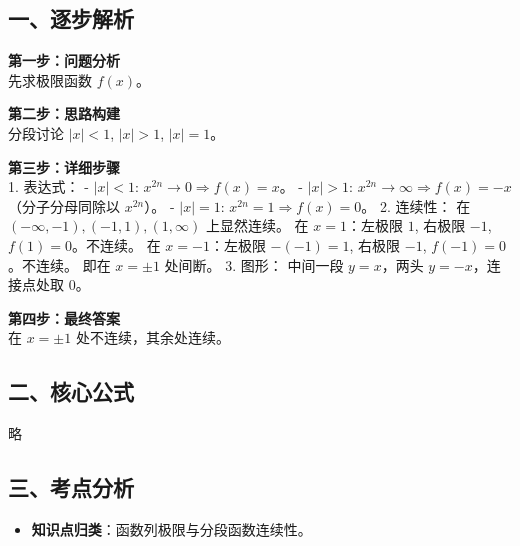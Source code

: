 \documentclass[12pt, a4paper]{ctexart}
\newenvironment{RedAnalysis}{
    \par
    \color{red} %
}{
    \par
    \color{black} %
}
\begin{document}
\begin{RedAnalysis}

\subsection*{一、逐步解析}

\textbf{第一步：问题分析} \\
先求极限函数 $f(x)$。

\textbf{第二步：思路构建} \\
分段讨论 $|x|<1$, $|x|>1$, $|x|=1$。

\textbf{第三步：详细步骤} \\
1. 表达式：
   - $|x| < 1$: $x^{2n} \to 0 \Rightarrow f(x) = x$。
   - $|x| > 1$: $x^{2n} \to \infty \Rightarrow f(x) = -x$（分子分母同除以 $x^{2n}$）。
   - $|x| = 1$: $x^{2n} = 1 \Rightarrow f(x) = 0$。
2. 连续性：
   在 $(-\infty, -1), (-1, 1), (1, \infty)$ 上显然连续。
   在 $x=1$：左极限 $1$, 右极限 $-1$, $f(1)=0$。不连续。
   在 $x=-1$：左极限 $-(-1)=1$, 右极限 $-1$, $f(-1)=0$。不连续。
   即在 $x=\pm 1$ 处间断。
3. 图形：
   中间一段 $y=x$，两头 $y=-x$，连接点处取 0。

\textbf{第四步：最终答案} \\
在 $x=\pm 1$ 处不连续，其余处连续。

\subsection*{二、核心公式}
略

\subsection*{三、考点分析}
\begin{itemize}
    \item \textbf{知识点归类}：函数列极限与分段函数连续性。
\end{itemize}

\end{RedAnalysis}
\end{document}
